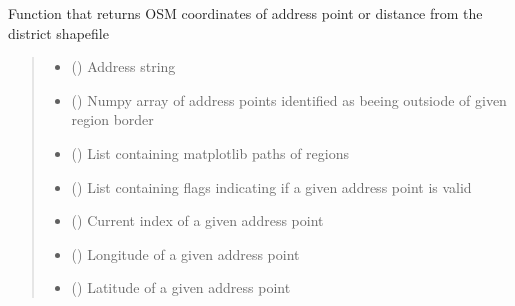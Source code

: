 \documentclass[letterpaper,10pt,english]{sphinxmanual}
\begin{document}
\begin{fulllineitems}
\label{\detokenize{geo_utilities:geo_utilities.get_osm_coords}}
\pysigstartsignatures
{}
\pysigstopsignatures
\sphinxAtStartPar
Function that returns OSM coordinates of address point or distance from the district shapefile
\begin{quote}\begin{description}
\begin{itemize}
\item {} 
\sphinxAtStartPar
{} () \textendash{} Address string

\item {} 
\sphinxAtStartPar
{} () \textendash{} Numpy array of address points identified as beeing outsiode of given region border

\item {} 
\sphinxAtStartPar
{} (\sphinxcode{\sphinxupquote{List}}{[}\sphinxcode{\sphinxupquote{Path}}{]}) \textendash{} List containing matplotlib paths of regions

\item {} 
\sphinxAtStartPar
{} (\sphinxcode{\sphinxupquote{List}}{[}\sphinxcode{\sphinxupquote{int}}{]}) \textendash{} List containing flags indicating if a given address point is valid

\item {} 
\sphinxAtStartPar
{} () \textendash{} Current index of a given address point

\item {} 
\sphinxAtStartPar
{} () \textendash{} Longitude of a given address point

\item {} 
\sphinxAtStartPar
{} () \textendash{} Latitude of a given address point


\end{itemize}
\end{description}
\end{quote}
\end{fulllineitems}
\end{document}
